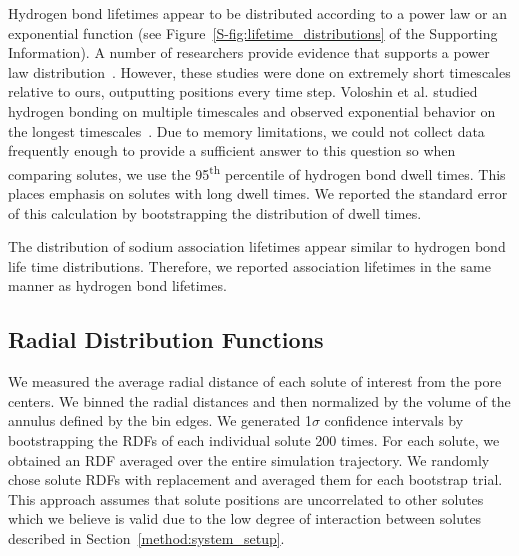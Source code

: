 \documentclass[journal=jpcbfk,manuscript=article]{achemso}
\begin{document}
  Hydrogen bond lifetimes appear to be distributed according to a power law or an
  exponential function (see Figure~\ref{S-fig:lifetime_distributions} of the 
  Supporting Information). A number of researchers provide evidence that supports a 
  power law distribution~\cite{starr_fast_1999,martiniano_insights_2013}. However, these
  studies were done on extremely short timescales relative to ours, outputting positions
  every time step. Voloshin et al. studied hydrogen bonding on multiple timescales and 
  observed exponential behavior on the longest timescales~\cite{voloshin_hydrogen_2009}. 
  Due to memory limitations, we could not collect data frequently enough to provide a
  sufficient answer to this question so when comparing solutes, we use the 95\textsuperscript{th} 
  percentile of hydrogen bond dwell times. This places emphasis on solutes with 
  long dwell times. We reported the standard error of this calculation by bootstrapping
  the distribution of dwell times.
  
  The distribution of sodium association lifetimes appear similar to
  hydrogen bond life time distributions. Therefore, we reported association
  lifetimes in the same manner as hydrogen bond lifetimes.
  
  \subsection{Radial Distribution Functions}\label{method:rdfs}

  We measured the average radial distance of each solute of interest 
  from the pore centers. We binned the radial distances and then 
  normalized by the volume of the annulus defined by the bin edges.
  We generated 1$\sigma$ confidence intervals by bootstrapping the 
  RDFs of each individual solute 200 times. For each solute, we obtained
  an RDF averaged over the entire simulation trajectory. We randomly 
  chose solute RDFs with replacement and averaged them for each bootstrap
  trial. This approach assumes that solute positions are uncorrelated to
  other solutes which we believe is valid due to the low degree of 
  interaction between solutes described in Section~\ref{method:system_setup}.
  
\end{document}
